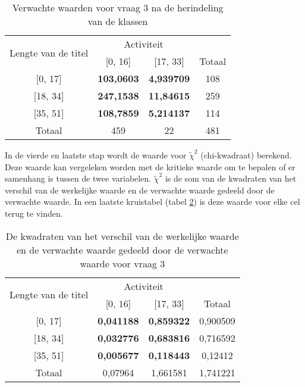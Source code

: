 \begin{table}[]
	\centering
	\begin{tabular}{|c|c|c|c|}
		\hline
		\multirow{2}{*}{Lengte van de titel} & \multicolumn{2}{c|}{Activiteit}       & \multicolumn{1}{l|}{} \\ \cline{2-4} 
		& {[}0, 16{]}       & {[}17, 33{]}      & Totaal                \\ \hline
		{[}0, 17{]}                          & \textbf{103,0603} & \textbf{4,939709} & 108                   \\ \hline
		{[}18, 34{]}                         & \textbf{247,1538} & \textbf{11,84615} & 259                   \\ \hline
		{[}35, 51{]}                         & \textbf{108,7859} & \textbf{5,214137} & 114                   \\ \hline
		Totaal                               & 459               & 22                & 481                   \\ \hline
	\end{tabular}
	\caption{Verwachte waarden voor vraag 3 na de herindeling van de klassen}
	\label{table:tablecorrectV}
\end{table}

In de vierde en laatste stap wordt de waarde voor $\tilde\chi^2$ (chi-kwadraat) berekend. Deze waarde kan vergeleken worden met de kritieke waarde om te bepalen of er samenhang is tussen de twee variabelen. $\tilde\chi^2$ is de som van de kwadraten van het verschil van de werkelijke waarde en de verwachte waarde gedeeld door de verwachte waarde. In een laatste kruistabel (tabel \ref{table:tablecorrectvalues}) is deze waarde voor elke cel terug te vinden.

\begin{table}[]
	\centering
	\begin{tabular}{|c|c|c|c|}
		\hline
		\multirow{2}{*}{Lengte van de titel} & \multicolumn{2}{c|}{Activiteit}       & \multicolumn{1}{l|}{} \\ \cline{2-4} 
		& {[}0, 16{]}       & {[}17, 33{]}      & Totaal                \\ \hline
		{[}0, 17{]}                          & \textbf{0,041188} & \textbf{0,859322} & 0,900509              \\ \hline
		{[}18, 34{]}                         & \textbf{0,032776} & \textbf{0,683816} & 0,716592              \\ \hline
		{[}35, 51{]}                         & \textbf{0,005677} & \textbf{0,118443} & 0,12412               \\ \hline
		Totaal                               & 0,07964           & 1,661581          & 1,741221              \\ \hline
	\end{tabular}
	\caption{De kwadraten van het verschil van de werkelijke waarde en de verwachte waarde gedeeld door de verwachte waarde voor vraag 3}
	\label{table:tablecorrectvalues}
\end{table}

